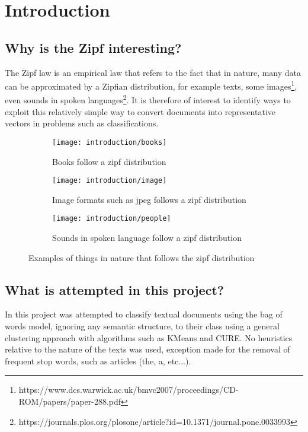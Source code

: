\documentclass[\main/main.tex]{subfiles}
\begin{document}
\chapter{Introduction}
\section{Why is the Zipf interesting?}
The Zipf law is an empirical law that refers to the fact that in nature, many data can be approximated by a Zipfian distribution, for example texts, some images\footnote{https://www.dcs.warwick.ac.uk/bmvc2007/proceedings/CD-ROM/papers/paper-288.pdf}, even sounds in spoken languages\footnote{https://journals.plos.org/plosone/article?id=10.1371/journal.pone.0033993}. It is therefore of interest to identify ways to exploit this relatively simple way to convert documents into representative vectors in problems such as classifications.

\begin{figure}
  \begin{subfigure}{0.32\textwidth}
    \texttt{[image: introduction/books]}
    \caption{Books follow a zipf distribution}
  \end{subfigure}
  \begin{subfigure}{0.32\textwidth}
    \texttt{[image: introduction/image]}
    \caption{Image formats such as jpeg follows a zipf distribution}
  \end{subfigure}
  \begin{subfigure}{0.32\textwidth}
    \texttt{[image: introduction/people]}
    \caption{Sounds in spoken language follow a zipf distribution}
  \end{subfigure}
  \caption{Examples of things in nature that follows the zipf distribution}
\end{figure}

\section{What is attempted in this project?}
In this project was attempted to classify textual documents using the bag of words model, ignoring any semantic structure, to their class using a general clustering approach with algorithms such as KMeans and CURE. No heuristics relative to the nature of the texts was used, exception made for the removal of frequent stop words, such as articles (the, a, etc...).
\end{document}
